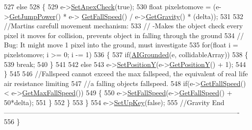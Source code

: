 \begin{DoxyCode}
527         \textcolor{keywordflow}{else}
528         \{
529             e->\hyperlink{classAI_acb9cc6624a01a27516f68406429f7496}{SetApexCheck}(\textcolor{keyword}{true});
530             \textcolor{keywordtype}{float} pixelstomove = (e->\hyperlink{classAI_a92873a9908dc947bba6f7270765614a7}{GetJumpPower}() * e->
      \hyperlink{classAI_a5518f137f504e35a88a16a374c30390b}{GetFallSpeed}() / e->\hyperlink{classAI_aaf2f8c7e9bf518bee620e5731faa1ed7}{GetGravity}() * (delta));
531 
532             \textcolor{comment}{//Martins carefull movement mechanism:}
533             \textcolor{comment}{//  -Makes the object check every pixel it moves for collision, prevents object in falling
       through the ground}
534             \textcolor{comment}{//  Bug: It might move 1 pixel into the ground, must investigate}
535             \textcolor{keywordflow}{for}(\textcolor{keywordtype}{float} i = pixelstomove; i >= 0; i -= 1)
536             \{
537                 \textcolor{keywordflow}{if}(\hyperlink{classPhysics_a4d4fa441923dfc16187236f9f9bb21e0}{AIGrounded}(e, collidableArray))
538                 \{
539                     \textcolor{keywordflow}{break};
540                 \}
541 
542                 \textcolor{keywordflow}{else}
543                     e->\hyperlink{classAI_a4e042958bb678aebdee4af9925efa389}{SetPositionY}(e->\hyperlink{classAI_af234b480b8502f3dc1b1f3bac15e8b98}{GetPositionY}() + 1);
544             \}
545 
546             \textcolor{comment}{//Fallspeed cannot exceed the max fallspeed, the equivalent of real life air resistance
       limiting}
547             \textcolor{comment}{//a falling objects fallspeed.}
548             \textcolor{keywordflow}{if}(e->\hyperlink{classAI_a5518f137f504e35a88a16a374c30390b}{GetFallSpeed}() < e->\hyperlink{classAI_a9c878567c39d6a9c293931a679b37ffd}{GetMaxFallSpeed}())
549             \{
550                 e->\hyperlink{classAI_ab42bf8c5b4ec0d54423b55e2db524640}{SetFallSpeed}(e->\hyperlink{classAI_a5518f137f504e35a88a16a374c30390b}{GetFallSpeed}() + 50*delta);
551             \}
552         \}
553     \}
554     e->\hyperlink{classAI_ab4061283b1ef4cb50b6d7110882c20ab}{SetUpKey}(\textcolor{keyword}{false});
555     \textcolor{comment}{//Gravity
       End-------------------------------------------------------------------------------------------------------}
556 \}
\end{DoxyCode}
